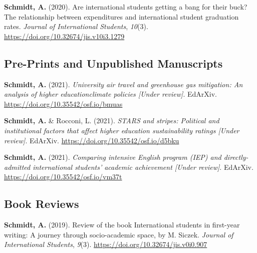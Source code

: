 \documentclass[10pt,a4paper,]{article}
\begin{document}
\begingroup
\setlength{\parindent}{-0.5in}
\setlength{\leftskip}{0.5in}

\hypertarget{refs_anthony_pub}{}
\leavevmode\hypertarget{ref-schmidt2020}{}%
\textbf{Schmidt, A.} (2020). Are international students getting a bang for their buck? The relationship between expenditures and international student graduation rates. \emph{Journal of International Students}, \emph{10}(3). \url{https://doi.org/10.32674/jis.v10i3.1279}

\endgroup

\hypertarget{pre-prints-and-unpublished-manuscripts}{%
\subsection{Pre-Prints and Unpublished Manuscripts}\label{pre-prints-and-unpublished-manuscripts}}

\begingroup
\setlength{\parindent}{-0.5in}
\setlength{\leftskip}{0.5in}

\textbf{Schmidt, A.} (2021). \emph{University air travel and greenhouse gas mitigation: An analysis of higher educationclimate policies {[}Under review{]}}. EdArXiv. \url{https://doi.org/10.35542/osf.io/bmuas}

\textbf{Schmidt, A.} \& Rocconi, L. (2021). \emph{STARS and stripes: Political and institutional factors that affect higher education sustainability ratings {[}Under review{]}}. EdArXiv. \url{https://doi.org/10.35542/osf.io/d5bku}

\textbf{Schmidt, A.} (2021). \emph{Comparing intensive English program (IEP) and directly-admitted international students' academic achievement
{[}Under review{]}}. EdArXiv. \url{https://doi.org/10.35542/osf.io/vm37t}

\endgroup

\hypertarget{book-reviews}{%
\subsection{Book Reviews}\label{book-reviews}}

\begingroup
\setlength{\parindent}{-0.5in}
\setlength{\leftskip}{0.5in}

\hypertarget{refs_anthony_reviews}{}
\leavevmode\hypertarget{ref-schmidt2019}{}%
\textbf{Schmidt, A.} (2019). Review of the book International students in first-year writing: A journey through socio-academic space, by M. Siczek. \emph{Journal of International Students}, \emph{9}(3). \url{https://doi.org/10.32674/jis.v0i0.907}
\end{document}
